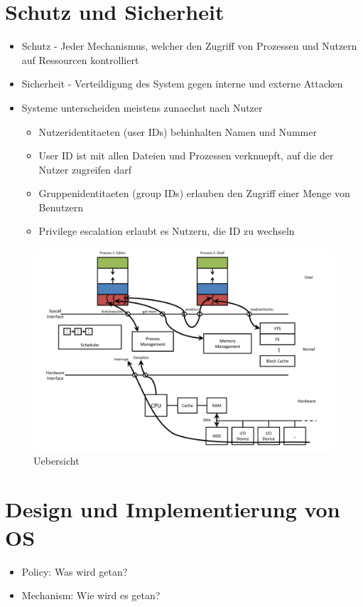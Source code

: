 \documentclass[a4paper]{scrreprt}
\begin{document}
\section{Schutz und Sicherheit}
\begin{itemize}
	\item Schutz - Jeder Mechanismus, welcher den Zugriff von Prozessen und Nutzern auf Ressourcen kontrolliert
	\item Sicherheit - Verteildigung des System gegen interne und externe Attacken
	\item Systeme unterscheiden meistens zunaechst nach Nutzer
		\begin{itemize}
			\item Nutzeridentitaeten (user IDs) behinhalten Namen und Nummer
			\item User ID ist mit allen Dateien und Prozessen verknuepft, auf die der Nutzer zugreifen darf
			\item Gruppenidentitaeten (group IDs) erlauben den Zugriff einer Menge von Benutzern
			\item Privilege escalation erlaubt es Nutzern, die ID zu wechseln
		\end{itemize}
\end{itemize}

\begin{figure}[ht]
\centering
\includegraphics[scale=0.5]{big_picture.png}
\caption{Uebersicht}
\end{figure}

\section{Design und Implementierung von OS}
\begin{itemize}
	\item Policy: Was wird getan?
	\item Mechanism: Wie wird es getan?
\end{itemize}
\end{document}
